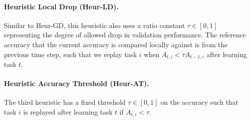 \vspace{-3mm}
\paragraph{Heuristic Local Drop (Heur-LD).} Similar to Heur-GD, this heuristic also uses a ratio constant $\tau \in [0, 1]$ representing the degree of allowed drop in validation performance. The reference accuracy that the current accuracy is compared locally against is from the previous time step, such that we replay task $i$ when $A_{t, i} < \tau A_{t-1, i}$ after learning task $t$.

\vspace{-3mm}
\paragraph{Heuristic Accuracy Threshold (Heur-AT).} The third heuristic has a fixed threshold $\tau \in [0, 1]$ on the accuracy such that task $i$ is replayed after learning task $t$ if $A_{t, i} < \tau$.




